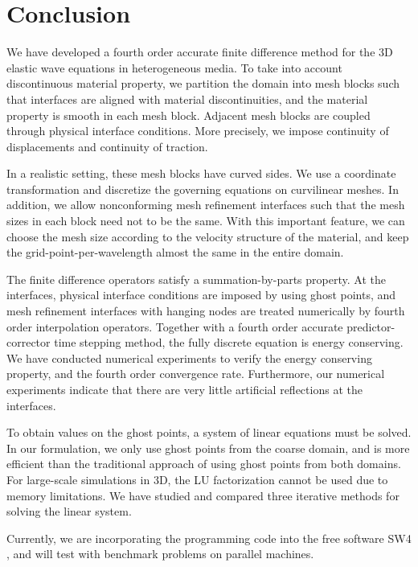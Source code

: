 \section{Conclusion}
We have developed a fourth order accurate finite difference method for the 3D elastic wave equations in heterogeneous media. To take into account discontinuous material property, we partition the domain into mesh blocks such that interfaces are aligned with material discontinuities, and the material property is smooth in each mesh block. Adjacent mesh blocks are coupled through physical interface conditions. More precisely, we impose continuity of displacements and continuity of traction. 

In a realistic setting, these mesh blocks have curved sides. We use a coordinate transformation and discretize the governing equations on curvilinear meshes. In addition, we allow nonconforming mesh refinement interfaces such that the mesh sizes in each block need not to be the same. With this important feature, we can choose the mesh size according to the velocity structure of the material, and keep the grid-point-per-wavelength almost the same in the entire domain. 

The finite difference operators satisfy a summation-by-parts property. At the interfaces, physical interface conditions are imposed by using ghost points, and mesh refinement interfaces with hanging nodes are treated numerically by fourth order interpolation operators. Together with a fourth order accurate predictor-corrector time stepping method, the fully discrete equation is energy conserving. We have conducted numerical experiments to verify the energy conserving property, and the fourth order convergence rate. Furthermore, our numerical experiments indicate that there are very little artificial reflections at the interfaces.

To obtain values on the ghost points, a system of linear equations must be solved. In our formulation, we only use ghost points from the coarse domain, and is more efficient than the traditional approach of using ghost points from both domains.  For large-scale simulations in 3D, the LU factorization cannot be used due to memory limitations. We have studied and compared three iterative methods for solving the linear system.

Currently, we are incorporating the programming code into the free software SW4 \cite{SW4}, and will test with benchmark problems on parallel machines. 